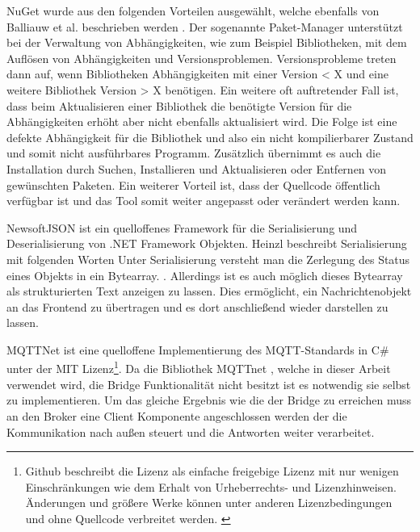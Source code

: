     
    NuGet wurde aus den folgenden Vorteilen ausgewählt, welche ebenfalls von Balliauw et al. beschrieben werden \cite{balliauw2012pro}.
    Der sogenannte Paket-Manager unterstützt bei der Verwaltung von Abhängigkeiten, wie zum Beispiel Bibliotheken, mit dem Auflösen von Abhängigkeiten und Versionsproblemen. Versionsprobleme treten dann auf, wenn Bibliotheken Abhängigkeiten mit einer Version < X und eine weitere Bibliothek Version > X benötigen. Ein weitere oft auftretender Fall ist, dass beim Aktualisieren einer Bibliothek die benötigte Version für die Abhängigkeiten erhöht aber nicht ebenfalls aktualisiert wird. Die Folge ist eine defekte Abhängigkeit für die Bibliothek und also ein nicht kompilierbarer Zustand  und somit nicht ausführbares Programm. Zusätzlich übernimmt es auch die Installation durch Suchen, Installieren und Aktualisieren oder Entfernen von gewünschten Paketen. Ein weiterer Vorteil ist, dass der Quellcode öffentlich verfügbar ist und das Tool somit weiter angepasst oder verändert werden kann.
    
    NewsoftJSON \cite{newton_king_2013} ist ein quelloffenes Framework für die Serialisierung und Deserialisierung von .NET Framework Objekten.
    Heinzl beschreibt Serialisierung mit folgenden Worten \glqq Unter Serialisierung versteht man die Zerlegung des Status eines Objekts in ein Bytearray.\grqq{} \cite{Heinzl2005}. Allerdings ist es auch möglich dieses Bytearray als strukturierten Text anzeigen zu lassen.
    Dies ermöglicht, ein Nachrichtenobjekt an das Frontend zu übertragen und es dort anschließend wieder darstellen zu lassen.
    
    MQTTNet ist eine quelloffene Implementierung des \ac{MQTT}-Standards in C\# unter der MIT Lizenz\footnote{
    Github beschreibt die Lizenz als einfache freigebige Lizenz mit nur wenigen Einschränkungen wie dem Erhalt von Urheberrechts- und Lizenzhinweisen. Änderungen und größere Werke können unter anderen Lizenzbedingungen und ohne Quellcode verbreitet werden. \cite{github_inc_2019}
    }.
    Da die Bibliothek MQTTnet \cite{chkr1011_2018},
    welche in dieser Arbeit verwendet wird, die Bridge Funktionalität nicht besitzt ist es notwendig sie selbst zu implementieren. Um das gleiche Ergebnis wie die der Bridge zu erreichen muss an den Broker eine Client Komponente angeschlossen werden der die Kommunikation nach außen steuert und die Antworten weiter verarbeitet. 
    
